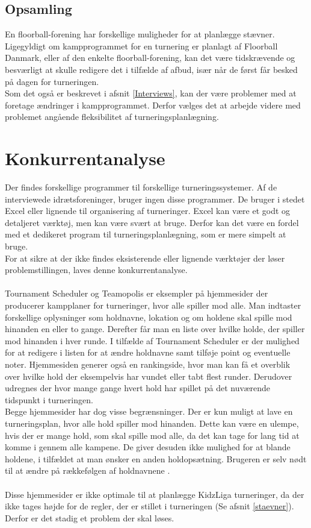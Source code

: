 \subsection*{Opsamling} 
En floorball-forening har forskellige muligheder for at planlægge stævner. Ligegyldigt om kampprogrammet for en turnering er planlagt af Floorball Danmark, eller af den enkelte floorball-forening, kan det være tidskrævende og besværligt at skulle redigere det i tilfælde af afbud, især når de først får besked på dagen for turneringen.\\ 
Som det også er beskrevet i afsnit \ref{Interviews}, kan der være problemer med at foretage ændringer i kampprogrammet. Derfor vælges det at arbejde videre med problemet angående fleksibilitet af turneringsplanlægning.

\section{Konkurrentanalyse}
Der findes forskellige programmer til forskellige turneringssystemer. Af de interviewede idrætsforeninger, bruger ingen disse programmer. De bruger i stedet Excel eller lignende til organisering af turneringer. Excel kan være et godt og detaljeret værktøj, men kan være svært at bruge. Derfor kan det være en fordel med et dedikeret program til turneringsplanlægning, som er mere simpelt at bruge.\\
For at sikre at der ikke findes eksisterende eller lignende værktøjer der løser problemstillingen, laves denne konkurrentanalyse.
\\\\
Tournament Scheduler og Teamopolis er eksempler på hjemmesider der producerer kampplaner for turneringer, hvor alle spiller mod alle. Man indtaster forskellige oplysninger som holdnavne, lokation og om holdene skal spille mod hinanden en eller to gange. Derefter får man en liste over hvilke holde, der spiller mod hinanden i hver runde. I tilfælde af Tournament Scheduler er der mulighed for at redigere i listen for at ændre holdnavne samt tilføje point og eventuelle noter. Hjemmesiden generer også en rankingside, hvor man kan få et overblik over hvilke hold der eksempelvis har vundet eller tabt flest runder. Derudover udregnes der hvor mange gange hvert hold har spillet på det nuværende tidspunkt i turneringen.\\
Begge hjemmesider har dog visse begrænsninger. Der er kun muligt at lave en turneringsplan, hvor alle hold spiller mod hinanden. Dette kan være en ulempe, hvis der er mange hold, som skal spille mod alle, da det kan tage for lang tid at komme i gennem alle kampene. De giver desuden ikke mulighed for at blande holdene, i tilfældet at man ønsker en anden holdopsætning. Brugeren er selv nødt til at ændre på rækkefølgen af holdnavnene \citep{Teamopolis}\citep{TournamentScheduler}.
\\\\
Disse hjemmesider er ikke optimale til at planlægge KidzLiga turneringer, da der ikke tages højde for de regler, der er stillet i turneringen (Se afsnit \ref{staevner}). Derfor er det stadig et problem der skal løses. 